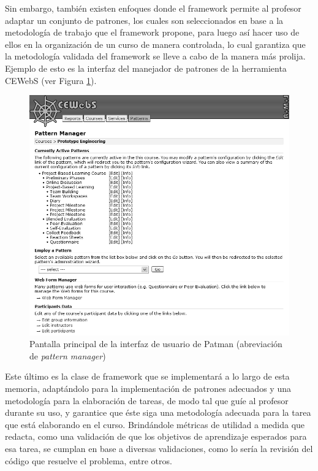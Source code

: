 \documentclass[letterpaper,12pt]{article}
\begin{document}
Sin embargo, también existen enfoques donde el framework permite al profesor adaptar un conjunto de patrones, los cuales son seleccionados en base a la metodología de trabajo que el framework propone, para luego así hacer uso de ellos en la organización de un curso de manera controlada, lo cual garantiza que la metodología validada del framework se lleve a cabo de la manera más prolija. Ejemplo de esto es la interfaz del manejador de patrones de la herramienta CEWebS \cite{Mangler04cewebs} (ver Figura \ref{ceweb}).

\begin{figure}[H]
  \centering
  \includegraphics[width=1\textwidth]{ceweb.png}
  \caption{Pantalla principal de la interfaz de usuario de Patman (abreviación de \textit{pattern manager}) \cite{Mangler04cewebs}}
  \label{ceweb}
\end{figure}

Este último es la clase de framework que se implementará a lo largo de esta memoria, adaptándolo para la implementación de patrones adecuados y una metodología para la elaboración de tareas, de modo tal que guíe al profesor durante su uso, y garantice que éste siga una metodología adecuada para la tarea que está elaborando en el curso. Brindándole métricas de utilidad a medida que redacta, como una validación de que los objetivos de aprendizaje esperados para esa tarea, se cumplan en base a diversas validaciones, como lo sería la revisión del código que resuelve el problema, entre otros.
\end{document}
